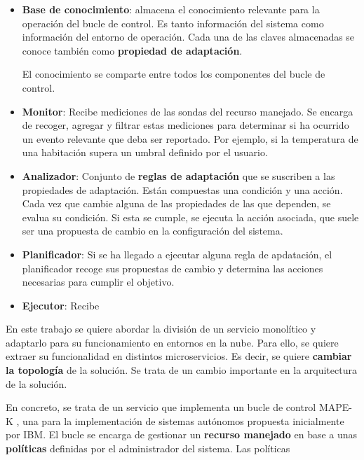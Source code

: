 \begin{itemize}
  \item \textbf{Base de conocimiento}: almacena el conocimiento relevante para la operación del bucle de control. Es tanto información del sistema como información del entorno de operación. Cada una de las claves almacenadas se conoce también como \textbf{propiedad de adaptación}.

  El conocimiento se comparte entre todos los componentes del bucle de control.

  \item \textbf{Monitor}: Recibe mediciones de las sondas del recurso manejado. Se encarga de recoger, agregar y filtrar estas mediciones para determinar si ha ocurrido un evento relevante que deba ser reportado. Por ejemplo, si la temperatura de una habitación supera un umbral definido por el usuario.

  \item \textbf{Analizador}: Conjunto de \textbf{reglas de adaptación} que se suscriben a las propiedades de adaptación. Están compuestas una condición y una acción. Cada vez que cambie alguna de las propiedades de las que dependen, se evalua su condición. Si esta se cumple, se ejecuta la acción asociada, que suele ser una propuesta de cambio en la configuración del sistema.

  \item \textbf{Planificador}: Si se ha llegado a ejecutar alguna regla de apdatación, el planificador recoge sus propuestas de cambio y determina las acciones necesarias para cumplir el objetivo.

  \item \textbf{Ejecutor}: Recibe
\end{itemize}


En este trabajo se quiere abordar la división de un servicio monolítico y adaptarlo para su funcionamiento en entornos en la nube. Para ello, se quiere extraer su funcionalidad en distintos microservicios. Es decir, se quiere \textbf{cambiar la topología} de la solución. Se trata de un cambio importante en la arquitectura de la solución.

En concreto, se trata de un servicio que implementa un bucle de control MAPE-K \cite{ArchitecturalBlueprintAutonomic2006, fonsServiciosAdaptivereadyPara2021}, una para la implementación de sistemas autónomos propuesta inicialmente por IBM. El bucle se encarga de gestionar un \textbf{recurso manejado} en base a unas \textbf{políticas} definidas por el administrador del sistema. Las políticas

